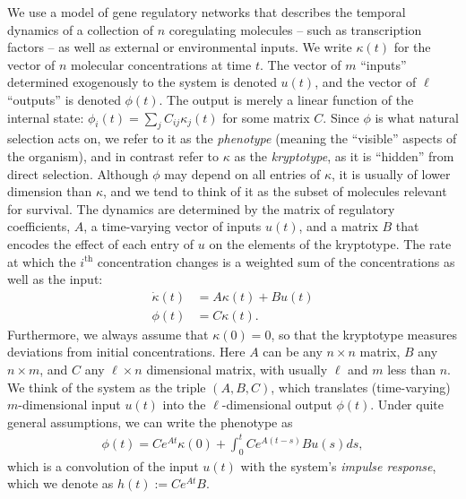 \documentclass{article}
\newcommand{\1}{\mathbbm{1}}
\begin{document}
We use a model of gene regulatory networks
that describes the temporal dynamics of
a collection of $n$ coregulating molecules
-- such as transcription factors -- as well as external or environmental inputs.
We write $\kappa(t)$ for the vector of $n$ molecular concentrations at time $t$.
The vector of $m$ ``inputs'' determined exogenously to the system is denoted $u(t)$,
and the vector of $\ell$ ``outputs'' is denoted $\phi(t)$.
The output is merely a linear function of the internal state:
$\phi_i(t) = \sum_j C_{ij} \kappa_j(t)$
for some matrix $C$.
Since $\phi$ is what natural selection acts on, we refer to it as the \emph{phenotype}
(meaning the ``visible'' aspects of the organism),
and in contrast refer to $\kappa$ as the \emph{kryptotype},
as it is ``hidden'' from direct selection.
Although $\phi$ may depend on all entries of $\kappa$,
it is usually of lower dimension than $\kappa$,
and we tend to think of it as the subset of molecules relevant for survival.
The dynamics are determined by
the matrix of regulatory coefficients, $A$,
a time-varying vector of inputs $u(t)$,
and a matrix $B$ that encodes the effect of each entry of $u$ on the elements of the kryptotype.
The rate at which the $i^\text{th}$ concentration changes
is a weighted sum of the concentrations
as well as the input:
\begin{equation}\label{eqn:system}
   \begin{aligned}
    \dot{\kappa}(t) &= A \kappa(t) + B u(t) \\
    \phi(t) &= C \kappa(t) .
  \end{aligned} 
\end{equation}
Furthermore, we always assume that $\kappa(0) = 0$,
so that the kryptotype measures deviations from initial concentrations. 
Here $A$ can be any $n \times n$ matrix, $B$ any $n \times m$, and $C$ any $\ell \times n$ dimensional matrix,
with usually $\ell$ and $m$ less than $n$.
We think of the system as the triple $(A,B,C)$,
which translates (time-varying) $m$-dimensional input $u(t)$ into the $\ell$-dimensional output $\phi(t)$.
Under quite general assumptions,
we can write the phenotype as
  \begin{align}
    \phi(t) = C e^{A t} \kappa(0) + \int_{0}^{t} C e^{A (t-s)} B u(s) ds ,
  \end{align}
which is a convolution of the input $u(t)$ with the system's \emph{impulse response},
which we denote as $h(t) := Ce^{A t}B$.
\end{document}
